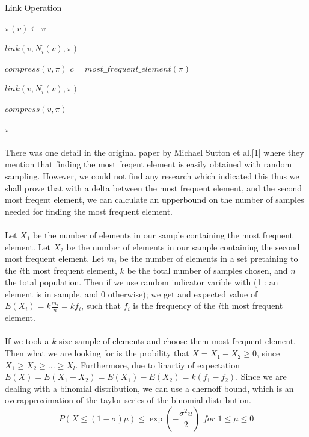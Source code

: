 \documentclass[]{article}
\begin{document}
\begin{algorithm}
\caption{Link Operation}\label{euclid}
\begin{algorithmic}[1]

\State $\pi(v) \gets v$
\EndFor

  \State $link(v,N_i(v),\pi)$
  \EndFor
\EndFor


\State $compress(v,\pi)$
\EndFor
\State $c = most\_frequent\_element(\pi)$

  \State $link(v,N_i(v),\pi)$
  \EndFor
\EndFor


\State $compress(v,\pi)$
\EndFor

\Return $\pi$
\EndProcedure
\end{algorithmic}
\end{algorithm}

\paragraph{}
There was one detail in the original paper by Michael Sutton et al.[1] where they mention that finding the most freqent element is easily obtained with random sampling. However, we could not find any research which indicated this thus we shall prove that with a delta between the most frequent element, and the second most freqent element, we can calculate an upperbound on the number of samples needed for finding the most frequent element.

\paragraph{}
Let $X_1$ be the number of elements in our sample containing the most frequent element.
Let $X_2$ be the number of elements in our sample containing the second most frequent element.
Let $m_i$ be the number of elements in a set pretaining to the $i$th most frequent element, $k$ be the total number of samples chosen, and $n$ the total population.
Then if we use random indicator varible with (1 : an element is in sample, and 0 otherwise); we get and expected value of $E(X_i) = k\frac{m_i}{n} = kf_i$, such that $f_i$ is the frequency of the $i$th  most frequent element.

\paragraph{}
If we took a $k$ size sample of elements and choose them most frequent element. Then what we are looking for is the probility that $X=X_1-X_2 \ge 0$, since $X_1 \ge X_2 \ge ... \ge X_l$. 
Furthermore, due to linartiy of expectation $E(X)=E(X_1-X_2) = E(X_1)-E(X_2) = k(f_1-f_2)$.
Since we are dealing with a binomial distribution, we can use a chernoff bound, which is an overapproximation of the taylor series of the binomial distribution.
$$P(X\le(1-\sigma)\mu) \le \exp(-\frac{\sigma^2 u}{2}) \textit{ for } 1 \le \mu \le 0$$
\end{document}
